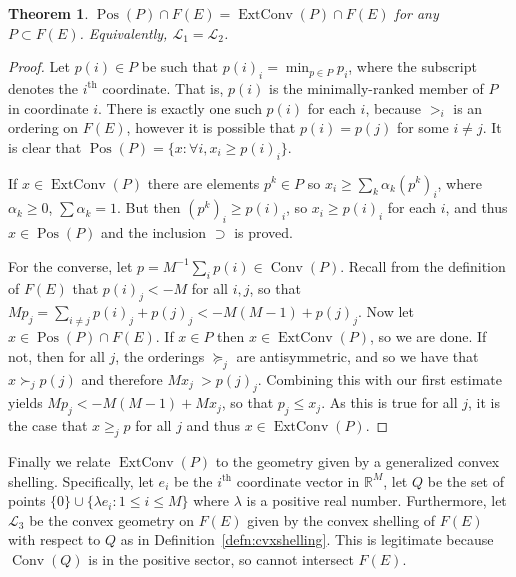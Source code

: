 \documentclass[12pt]{elsarticle}
\theoremstyle{plain}
\newtheorem{theorem}{Theorem}
\theoremstyle{definition}
\newcommand{\cgeom}{\mathcal{L}}
\DeclareMathOperator{\ExtHull}{ExtConv}
\DeclareMathOperator{\Hull}{Conv}
\DeclareMathOperator{\Pos}{Pos}
\begin{document}
\begin{theorem}\label{thm:exthull=pos}
$\Pos(P)\cap F(E)=\ExtHull(P)\cap F(E)$ for any $P\subset F(E)$.  Equivalently, $\cgeom_{1}=\cgeom_{2}$.
\end{theorem}
\begin{proof}
Let $p(i)\in P$ be such that $p(i)_{i}=\min_{p\in P} p_{i}$, where the subscript denotes the $i^{\text{th}}$ coordinate. That is, $p(i)$ is the minimally-ranked member of $P$ in coordinate $i$. There is exactly one such $p(i)$ for each $i$, because $>_{i}$ is an ordering on $F(E)$,  however it is possible that $p(i)=p(j)$ for some $i\neq j$.  It is clear that $\Pos(P)=\{x:\forall i, x_{i}\geq p(i)_{i}\}$.

If $x\in\ExtHull(P)$ there are elements $p^{k}\in P$ so $x_{i}\geq \sum_{k} \alpha_{k}(p^{k})_{i}$, where $\alpha_{k}\geq0$, $\sum \alpha_{k}=1$.  But then $(p^{k})_{i}\geq p(i)_{i}$, so  $x_{i}\geq p(i)_{i}$ for each $i$, and thus $x\in\Pos(P)$ and the inclusion $\supset$ is proved.

For the converse, let $p=M^{-1}\sum_{i}p(i)\in\Hull(P)$.  Recall from the definition of $F(E)$ that $p(i)_{j}< -M$ for all $i,j$, so that $Mp_{j} = \sum_{i \neq j} p(i)_j+  p(j)_j< -M(M-1)+p(j)_{j}$.   Now let \mbox{$x\in\Pos(P) \cap F(E)$}.  If $x\in P$ then $x \in \ExtHull(P)$, so we are done.  If not, then for all $j$, the orderings $\succcurlyeq_{j}$ are antisymmetric, and so we have that $x\succ_{j}p(j)$ and therefore $Mx_{j}\ > p(j)_{j}$. \linebreak Combining this with our first estimate yields $Mp_{j} < -M(M-1)+Mx_{j}$, so that $p_{j}\leq x_{j}$.  As this is true for all $j$, it is the case that $x\geq_{j}p$ for all $j$ and thus $x\in\ExtHull(P)$.
\end{proof}

Finally we relate $\ExtHull(P)$ to the geometry given by a generalized convex shelling. Specifically, let $e_{i}$ be the $i^{\text{th}}$ coordinate vector in $\mathbb{R}^{M}$, let $Q$ be the set of points $\{0\}\cup\{\lambda e_{i}: 1\leq i\leq M\}$ where $\lambda$ is a positive real number. Furthermore, let $\cgeom_{3}$ be the convex geometry on $F(E)$ given by the convex shelling of $F(E)$ with respect to $Q$ as in Definition~\ref{defn:cvxshelling}. This is legitimate because $\Hull(Q)$ is in the positive sector, so cannot intersect $F(E)$.
\end{document}
